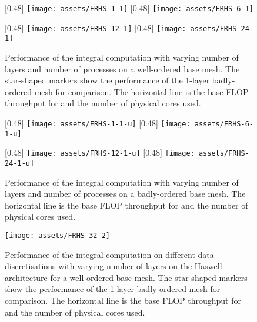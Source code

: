 \documentclass[11pt, a4paper]{scrartcl}
\begin{document}
\begin{figure}[p]
\centering
  [0.48\linewidth]
  {\texttt{[image: assets/FRHS-1-1]}}
  [0.48\linewidth]
  {\texttt{[image: assets/FRHS-6-1]}}

  \vspace{\baselineskip}
  [0.48\linewidth]
  {\texttt{[image: assets/FRHS-12-1]}}
  [0.48\linewidth]  
  {\texttt{[image: assets/FRHS-24-1]}}
  \caption{Performance of the  integral computation with varying
    number of layers and number of processes on a well-ordered base
    mesh. The star-shaped markers show the performance of the 1-layer
    badly-ordered mesh for comparison. The horizontal line is the base
    FLOP throughput for  and the number of physical
    cores used.}
  \label{fig:sandy-bridge-good-ordering}
\end{figure}

\begin{figure}[p]
  \centering
  [0.48\linewidth]
  {\texttt{[image: assets/FRHS-1-1-u]}}
  [0.48\linewidth]
  {\texttt{[image: assets/FRHS-6-1-u]}}

  \vspace{\baselineskip}
  [0.48\linewidth]
  {\texttt{[image: assets/FRHS-12-1-u]}}
  [0.48\linewidth]  
  {\texttt{[image: assets/FRHS-24-1-u]}}

  \caption{Performance of the  integral computation with varying
    number of layers and number of processes on a badly-ordered base
    mesh. The horizontal line is the base FLOP throughput for
     and the number of physical cores used.}
  \label{fig:sandy-bridge-bad-ordering}
\end{figure}

\begin{figure}
  \centering
  \texttt{[image: assets/FRHS-32-2]}
  \caption{Performance of the  integral computation on different
    data discretisations with varying number of layers on the Haswell
    architecture for a well-ordered base mesh. The star-shaped markers
    show the performance of the 1-layer badly-ordered mesh for
    comparison.  The horizontal line is the base FLOP throughput for
     and the number of physical cores
    used.}
  \label{fig:haswell-good-ordering}
\end{figure}
\end{document}
